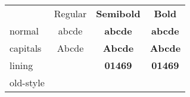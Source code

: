 \documentclass[12pt]{standalone}
\newcommand*\spA{abcde}
\newcommand*\spB{01469}
\newcommand*\spr[1][\spA]{& #1 & #1 & #1 \\}
\begin{document}
\centering
\begin{tabular}{
		>{\sourceserifpro}l
		>{\sourceserifpro}c
		>{\sourceserifprosemibold\bfseries}c
		>{\sourceserifpro\bfseries}c }
	& Regular & Semibold & Bold \\
	normal               \spr
	capitals             \spr[\MakeUppercase\spA]
	lining               \spr[\spB]
	old-style            \spr[\oldstylenums{\spB}]
\end{tabular}
\end{document}

